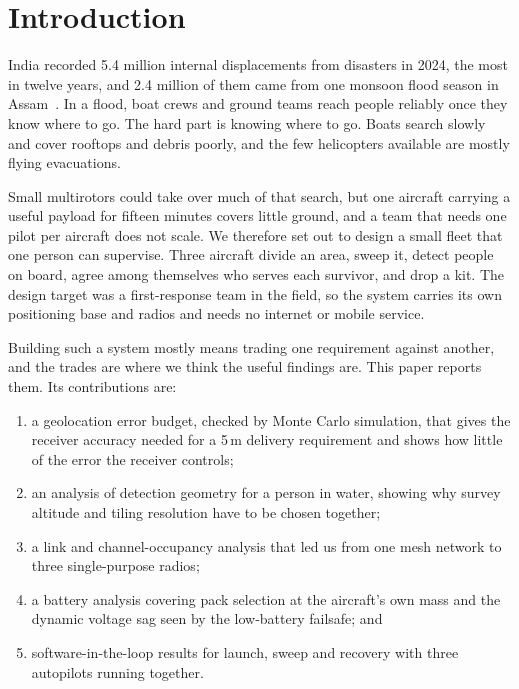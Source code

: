 \documentclass[conference]{IEEEtran}
\begin{document}
\section{Introduction}

India recorded 5.4 million internal displacements from disasters in 2024, the
most in twelve years, and 2.4 million of them came from one monsoon flood season
in Assam~\cite{idmc2025grid}. In a flood, boat crews and ground teams reach
people reliably once they know where to go. The hard part is knowing where to
go. Boats search slowly and cover rooftops and debris poorly, and the few
helicopters available are mostly flying evacuations.

Small multirotors could take over much of that search, but one aircraft carrying
a useful payload for fifteen minutes covers little ground, and a team that needs
one pilot per aircraft does not scale. We therefore set out to design a small
fleet that one person can supervise. Three aircraft divide an area, sweep it,
detect people on board, agree among themselves who serves each survivor, and
drop a kit. The design target was a first-response team in the field, so the
system carries its own positioning base and radios and needs no internet or
mobile service.

Building such a system mostly means trading one requirement against another,
and the trades are where we think the useful findings are. This paper reports
them. Its contributions are:
\begin{enumerate}
  \item a geolocation error budget, checked by Monte Carlo simulation, that
        gives the receiver accuracy needed for a 5\,m delivery requirement and
        shows how little of the error the receiver controls;
  \item an analysis of detection geometry for a person in water, showing why
        survey altitude and tiling resolution have to be chosen together;
  \item a link and channel-occupancy analysis that led us from one mesh network
        to three single-purpose radios;
  \item a battery analysis covering pack selection at the aircraft's own mass
        and the dynamic voltage sag seen by the low-battery failsafe; and
  \item software-in-the-loop results for launch, sweep and recovery with three
        autopilots running together.
\end{enumerate}
\end{document}
